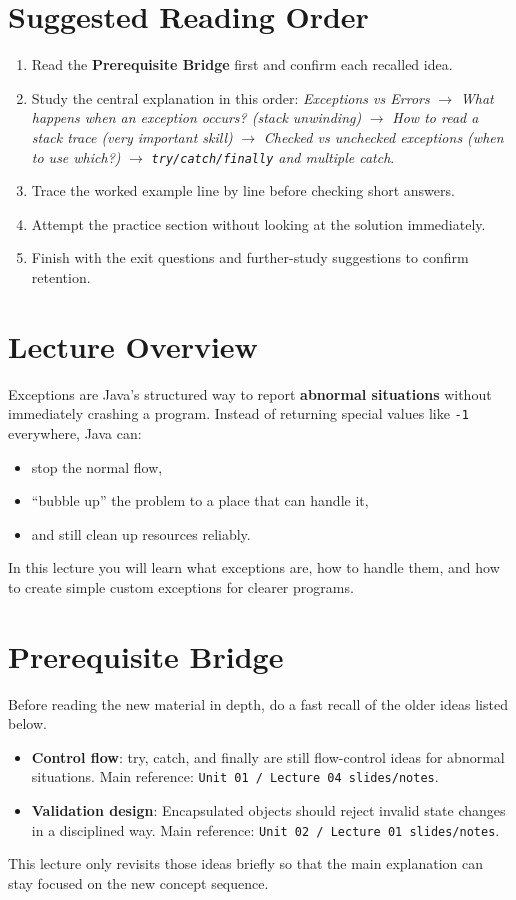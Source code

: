 \documentclass[11pt]{article}
\begin{document}
\section{Suggested Reading Order}
\begin{enumerate}
  \item Read the \textbf{Prerequisite Bridge} first and confirm each recalled idea.
  \item Study the central explanation in this order: \textit{Exceptions vs Errors} $\rightarrow$ \textit{What happens when an exception occurs? (stack unwinding)} $\rightarrow$ \textit{How to read a stack trace (very important skill)} $\rightarrow$ \textit{Checked vs unchecked exceptions (when to use which?)} $\rightarrow$ \textit{\texttt{try/catch/finally} and multiple catch}.
  \item Trace the worked example line by line before checking short answers.
  \item Attempt the practice section without looking at the solution immediately.
  \item Finish with the exit questions and further-study suggestions to confirm retention.
\end{enumerate}
\notesources{\OOPSUnitIIISources}

\section{Lecture Overview}
Exceptions are Java's structured way to report \textbf{abnormal situations} without immediately crashing a program.
Instead of returning special values like \texttt{-1} everywhere, Java can:
\begin{itemize}
  \item stop the normal flow,
  \item ``bubble up'' the problem to a place that can handle it,
  \item and still clean up resources reliably.
\end{itemize}
In this lecture you will learn what exceptions are, how to handle them, and how to create simple custom exceptions for clearer programs.
\notesources{\OOPSUnitIIISources}

\section{Prerequisite Bridge}
Before reading the new material in depth, do a fast recall of the older ideas listed below.
\begin{itemize}
  \item \textbf{Control flow}: try, catch, and finally are still flow-control ideas for abnormal situations. Main reference: \texttt{Unit 01 / Lecture 04 slides/notes}.
  \item \textbf{Validation design}: Encapsulated objects should reject invalid state changes in a disciplined way. Main reference: \texttt{Unit 02 / Lecture 01 slides/notes}.
\end{itemize}
This lecture only revisits those ideas briefly so that the main explanation can stay focused on the new concept sequence.
\notesources{\OOPSUnitIIISources}
\end{document}

